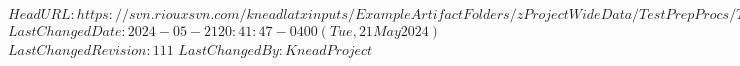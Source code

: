 \svnidlong
{$HeadURL: https://svn.riouxsvn.com/kneadlatxinputs/ExampleArtifactFolders/zProjectWideData/TestPrepProcs/TestPrep_AllRecords.tex $}
{$LastChangedDate: 2024-05-21 20:41:47 -0400 (Tue, 21 May 2024) $}
{$LastChangedRevision: 111 $}
{$LastChangedBy: KneadProject $}








